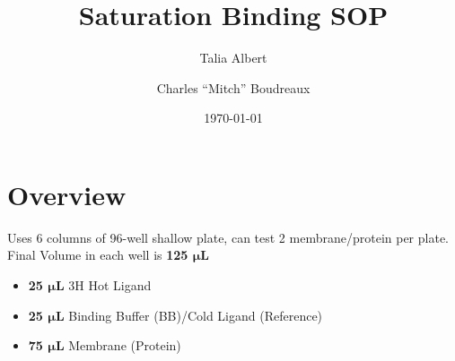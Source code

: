 \documentclass[12pt, letterpaper]{article}
\title{Saturation Binding SOP}
\author{
    Talia Albert
    \and
    Charles ``Mitch'' Boudreaux
}
\date{\today}
\begin{document}
\maketitle
\tableofcontents

\section{Overview}
Uses 6 columns of 96-well shallow plate, can test 2 membrane/protein per plate. Final Volume in each well is \textbf{125 $\bm{\mu}$L}
\begin{itemize}
    \item \textbf{25 $\bm{\mu}$L} 3H Hot Ligand
    \item \textbf{25 $\bm{\mu}$L} Binding Buffer (BB)/Cold Ligand (Reference)
    \item \textbf{75 $\bm{\mu}$L} Membrane (Protein)
\end{itemize}
\end{document}
